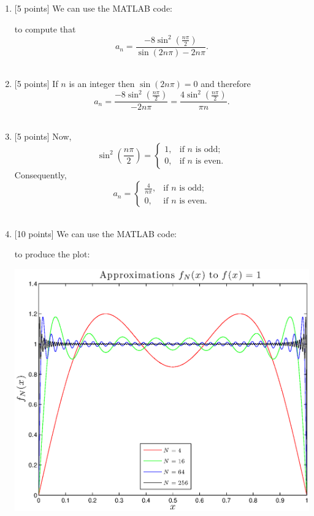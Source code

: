 \begin{solution}
\begin{enumerate}

\item {[5 points]}
We can use the MATLAB code:



to compute that
\[
a_n=\frac{-8\sin^2\left(\frac{n\pi}{2}\right)}{\sin\left(2n\pi\right)-2n\pi}.
\]
\\
\item {[5 points]}
If $n$ is an integer then $\sin\left(2n\pi\right)=0$ and therefore
\[
a_n=\frac{-8\sin^2\left(\frac{n\pi}{2}\right)}{-2n\pi}=\frac{4\sin^2\left(\frac{n\pi}{2}\right)}{\pi n}.
\]
\\
\item {[5 points]}
Now,
\[
\sin^2\left(\frac{n\pi}{2}\right)=\left\{\begin{array}{ll}
\displaystyle{1}, & \mbox{if }n\mbox{ is odd;}
\\
0, & \mbox{if }n\mbox{ is even.}
\end{array}\right.
\]
Consequently,
\[
a_n=\left\{\begin{array}{ll}
\displaystyle{\frac{4}{n\pi}}, & \mbox{if }n\mbox{ is odd;}
\\
0, & \mbox{if }n\mbox{ is even.}
\end{array}\right.
\]
\\
\item {[10 points]}
We can use the MATLAB code:



to produce the plot:
\begin{center}
\includegraphics[scale=0.7]{hw1d.eps}
\end{center}
\end{enumerate}
\end{solution}